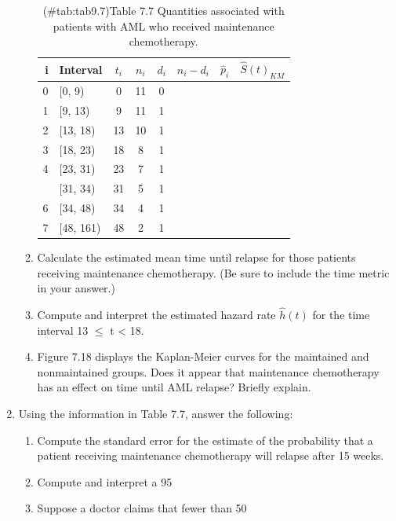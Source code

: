 \documentclass[
]{report}
\begin{document}
\begin{enumerate}
\begin{enumerate}
\begin{table}[!h]
\centering
\caption{(\#tab:tab9.7)Table 7.7 Quantities associated with patients with AML who received maintenance chemotherapy.}
\centering
\begin{tabular}[t]{rlcccccc}
\toprule
i & Interval & $t_i$ & $n_i$ & $d_i$ & $n_i - d_i$ & $\hat{p}_i$ & $\hat{S}(t)_{KM}$\\
\midrule
0 & {}[0, 9) & 0 & 11 & 0 &  &  & \\
1 & {}[9, 13) & 9 & 11 & 1 &  &  & \\
2 & {}[13, 18) & 13 & 10 & 1 &  &  & \\
3 & {}[18, 23) & 18 & 8 & 1 &  &  & \\
4 & {}[23, 31) & 23 & 7 & 1 &  &  & \\
\addlinespace
5 & {}[31, 34) & 31 & 5 & 1 &  &  & \\
6 & {}[34, 48) & 34 & 4 & 1 &  &  & \\
7 & {}[48, 161) & 48 & 2 & 1 &  &  & \\
\bottomrule
\end{tabular}
\end{table}

  \item Calculate the estimated mean time until relapse for those patients receiving maintenance chemotherapy. (Be sure to include the time metric in your answer.)
  \item Compute and interpret the estimated hazard rate $\hat{h}(t)$ for the time interval 13 $\leq$ t < 18.
  \item Figure 7.18 displays the Kaplan-Meier curves for the maintained and nonmaintained groups. Does it appear that maintenance chemotherapy has an effect on time until AML relapse? Briefly explain.
  \end{enumerate}

  \item Using the information in Table 7.7, answer the following:
  \begin{enumerate}
    \item Compute the standard error for the estimate of the probability that a patient receiving maintenance chemotherapy will relapse after 15 weeks.
    \item Compute and interpret a 95%
    \item Suppose a doctor claims that fewer than 50%
  \end{enumerate}


\end{enumerate}
\end{document}
